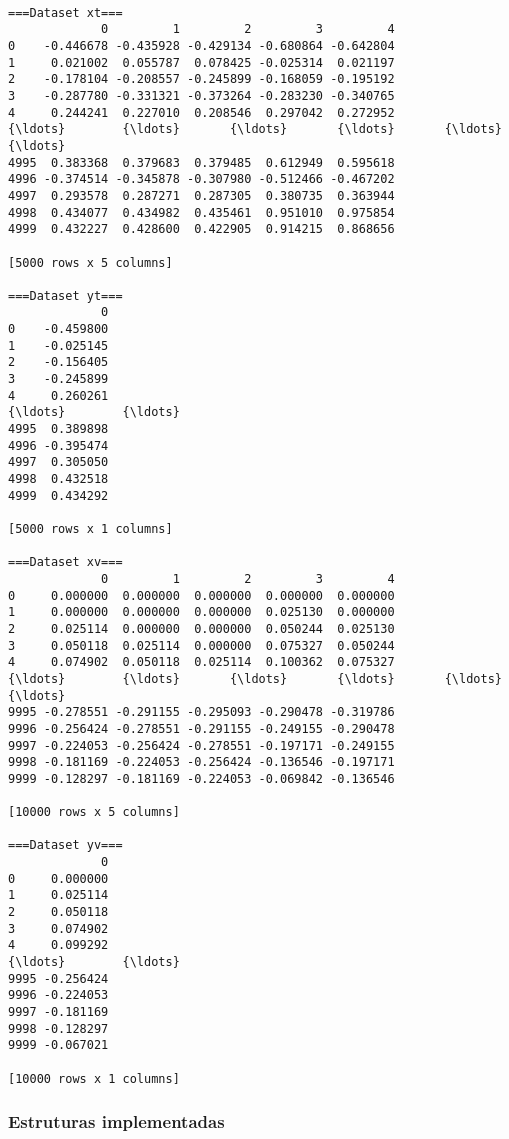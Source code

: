 \documentclass[11pt]{article}
\begin{document}
    \begin{Verbatim}[commandchars=\\\{\}]

===Dataset xt===
             0         1         2         3         4
0    -0.446678 -0.435928 -0.429134 -0.680864 -0.642804
1     0.021002  0.055787  0.078425 -0.025314  0.021197
2    -0.178104 -0.208557 -0.245899 -0.168059 -0.195192
3    -0.287780 -0.331321 -0.373264 -0.283230 -0.340765
4     0.244241  0.227010  0.208546  0.297042  0.272952
{\ldots}        {\ldots}       {\ldots}       {\ldots}       {\ldots}       {\ldots}
4995  0.383368  0.379683  0.379485  0.612949  0.595618
4996 -0.374514 -0.345878 -0.307980 -0.512466 -0.467202
4997  0.293578  0.287271  0.287305  0.380735  0.363944
4998  0.434077  0.434982  0.435461  0.951010  0.975854
4999  0.432227  0.428600  0.422905  0.914215  0.868656

[5000 rows x 5 columns]

===Dataset yt===
             0
0    -0.459800
1    -0.025145
2    -0.156405
3    -0.245899
4     0.260261
{\ldots}        {\ldots}
4995  0.389898
4996 -0.395474
4997  0.305050
4998  0.432518
4999  0.434292

[5000 rows x 1 columns]

===Dataset xv===
             0         1         2         3         4
0     0.000000  0.000000  0.000000  0.000000  0.000000
1     0.000000  0.000000  0.000000  0.025130  0.000000
2     0.025114  0.000000  0.000000  0.050244  0.025130
3     0.050118  0.025114  0.000000  0.075327  0.050244
4     0.074902  0.050118  0.025114  0.100362  0.075327
{\ldots}        {\ldots}       {\ldots}       {\ldots}       {\ldots}       {\ldots}
9995 -0.278551 -0.291155 -0.295093 -0.290478 -0.319786
9996 -0.256424 -0.278551 -0.291155 -0.249155 -0.290478
9997 -0.224053 -0.256424 -0.278551 -0.197171 -0.249155
9998 -0.181169 -0.224053 -0.256424 -0.136546 -0.197171
9999 -0.128297 -0.181169 -0.224053 -0.069842 -0.136546

[10000 rows x 5 columns]

===Dataset yv===
             0
0     0.000000
1     0.025114
2     0.050118
3     0.074902
4     0.099292
{\ldots}        {\ldots}
9995 -0.256424
9996 -0.224053
9997 -0.181169
9998 -0.128297
9999 -0.067021

[10000 rows x 1 columns]
    \end{Verbatim}

    \hypertarget{estruturas-implementadas}{%
\subsubsection{Estruturas
implementadas}\label{estruturas-implementadas}}
\end{document}
